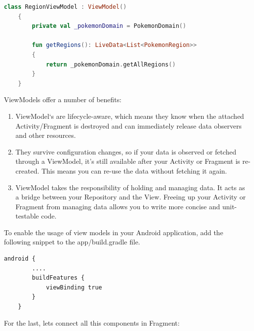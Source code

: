 \documentclass[a4paper, 12pt]{article}
\begin{document}
\begin{lstlisting}[caption={Region View Model Class.}, label={code:code_region_vm}, language=Kotlin]
    class RegionViewModel : ViewModel()
    {
        private val _pokemonDomain = PokemonDomain()
    
        fun getRegions(): LiveData<List<PokemonRegion>>
        {
            return _pokemonDomain.getAllRegions()
        }
    }

\end{lstlisting}

ViewModels offer a number of benefits:

\begin{enumerate}
	\item ViewModel‘s are lifecycle-aware, which means they know when the attached Activity/Fragment is destroyed and can immediately release data observers and other resources.
	\item They survive configuration changes, so if your data is observed or fetched through a ViewModel, it’s still available after your Activity or Fragment is re-created. This means you can re-use the data without fetching it again.
	\item ViewModel takes the responsibility of holding and managing data. It acts as a bridge between your Repository and the View. Freeing up your Activity or Fragment from managing data allows you to write more concise and unit-testable code.
\end{enumerate}

To enable the usage of view models in your Android application, add the following snippet to the app/build.gradle file.

\begin{lstlisting}[caption={Region Fragment.}, label={code:gradle_vm}, language=XML]
	android {
		....
		buildFeatures {
			viewBinding true
		}
	}
\end{lstlisting}

For the last, lets connect all this components in Fragment:
\end{document}
